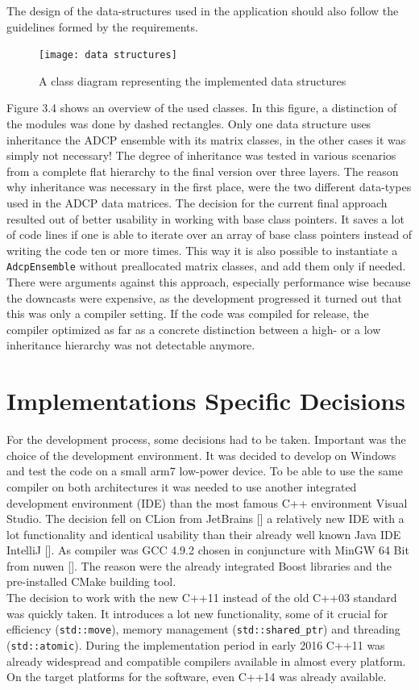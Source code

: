 The design of the data-structures used in the application should also follow the guidelines formed by the requirements. 
\begin{figure}[h]
\centering
      \texttt{[image: data structures]}
        \caption{A class diagram representing the implemented data structures}
\end{figure}
Figure 3.4 shows an overview of the used classes. In this figure, a distinction of the modules was done by dashed rectangles. Only one data structure uses inheritance the ADCP ensemble with its matrix classes, in the other cases it was simply not necessary! The degree of inheritance was tested in various scenarios from a complete flat hierarchy to the final version over three layers. The reason why inheritance was necessary in the first place, were the two different data-types used in the ADCP data matrices. The decision for the current final approach resulted out of better usability in working with base class pointers. It saves a lot of code lines if one is able to iterate over an array of base class pointers instead of writing the code ten or more times. This way it is also possible to instantiate a \texttt{AdcpEnsemble} without preallocated matrix classes, and add them only if needed. There were arguments against this approach, especially performance wise because the downcasts were expensive, as the development progressed it turned out that this was only a compiler setting. If the code was compiled for release, the compiler optimized as far as a concrete distinction between a high- or a low inheritance hierarchy was not detectable anymore.

\section{Implementations Specific Decisions}
For the development process, some decisions had to be taken. Important was the choice of the development environment. It was decided to develop on Windows and test the code on a small arm7 low-power device. To be able to use the same compiler on both architectures it was needed to use another integrated development environment (IDE) than the most famous C++ environment Visual Studio. The decision fell on CLion from JetBrains [] a relatively new IDE with a lot functionality and identical usability than their already well known Java IDE IntelliJ []. As compiler was GCC 4.9.2 chosen in conjuncture with MinGW 64 Bit from nuwen []. The reason were the already integrated Boost libraries and the pre-installed CMake building tool.\\
The decision to work with the new C++11 instead of the old C++03 standard was quickly taken. It introduces a lot new functionality, some of it crucial for efficiency (\texttt{std::move}), memory management (\texttt{std::shared\_ptr}) and threading (\texttt{std::atomic}). During the implementation period in early 2016 C++11 was already widespread and compatible compilers available in almost every platform. On the target platforms for the software, even C++14 was already available.
